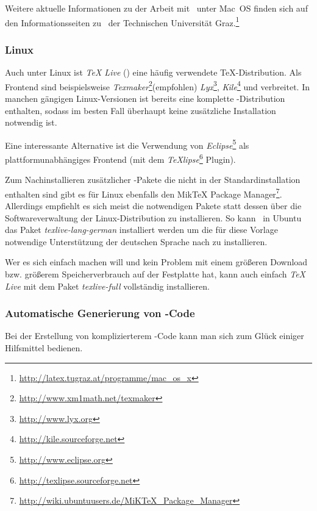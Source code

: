 Weitere aktuelle Informationen zu der Arbeit mit \latex\ unter Mac~OS finden sich auf den Informationsseiten zu \latex\ der Technischen Universität Graz.\footnote{\url{http://latex.tugraz.at/programme/mac_os_x}}

\subsubsection{Linux}

Auch unter \gls{Linux}  ist \emph{TeX Live} (\so) eine häufig verwendete TeX-Distri\-bution. 
Als Frontend sind beispielsweise
\emph{Texmaker}\footnote{\url{http://www.xm1math.net/texmaker}}(empfohlen) \emph{Lyx}\footnote{\url{http://www.lyx.org}},
\emph{Kile}\footnote{\url{http://kile.sourceforge.net}} und
verbreitet.
In manchen gängigen Linux-Versionen ist bereits eine komplette \latex-Distribution enthalten, sodass im besten Fall überhaupt keine zusätzliche Installation notwendig ist.  


Eine interessante Alternative ist die Verwendung von
\emph{Eclipse}\footnote{\url{http://www.eclipse.org}} als plattformunabhängiges Frontend 
(mit dem \emph{TeXlipse}\footnote{\url{http://texlipse.sourceforge.net}}
Plugin).


Zum Nachinstallieren zusätzlicher \latex-Pakete die nicht in der
Standardinstallation enthalten sind gibt es für Linux ebenfalls den MikTeX
Package Manager\footnote{\url{http://wiki.ubuntuusers.de/MiKTeX_Package_Manager}}. Allerdings empfiehlt es sich meist die notwendigen Pakete statt dessen über die Softwareverwaltung der Linux-Distribution zu installieren. So kann \zB\ in Ubuntu das Paket \emph{texlive-lang-german} installiert werden um die für diese Vorlage notwendige Unterstützung der deutschen Sprache nach zu installieren.


Wer es sich einfach machen will und kein Problem mit einem größeren Download bzw. größerem Speicherverbrauch auf der Festplatte hat, kann auch einfach \emph{TeX Live} mit dem Paket \emph{texlive-full} vollständig installieren.

\subsubsection{Automatische Generierung von \latex-Code}
Bei der Erstellung von komplizierterem \latex-Code kann man sich zum Glück
einiger Hilfsmittel bedienen.

